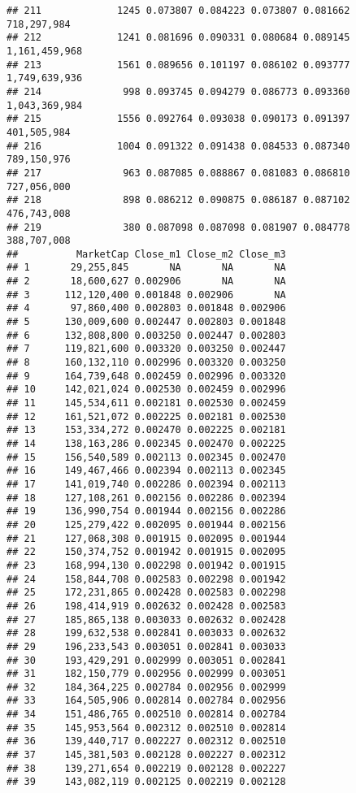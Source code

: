 \documentclass[]{article}
\begin{document}
\begin{verbatim}
## 211             1245 0.073807 0.084223 0.073807 0.081662   718,297,984
## 212             1241 0.081696 0.090331 0.080684 0.089145 1,161,459,968
## 213             1561 0.089656 0.101197 0.086102 0.093777 1,749,639,936
## 214              998 0.093745 0.094279 0.086773 0.093360 1,043,369,984
## 215             1556 0.092764 0.093038 0.090173 0.091397   401,505,984
## 216             1004 0.091322 0.091438 0.084533 0.087340   789,150,976
## 217              963 0.087085 0.088867 0.081083 0.086810   727,056,000
## 218              898 0.086212 0.090875 0.086187 0.087102   476,743,008
## 219              380 0.087098 0.087098 0.081907 0.084778   388,707,008
##          MarketCap Close_m1 Close_m2 Close_m3
## 1       29,255,845       NA       NA       NA
## 2       18,600,627 0.002906       NA       NA
## 3      112,120,400 0.001848 0.002906       NA
## 4       97,860,400 0.002803 0.001848 0.002906
## 5      130,009,600 0.002447 0.002803 0.001848
## 6      132,808,800 0.003250 0.002447 0.002803
## 7      119,821,600 0.003320 0.003250 0.002447
## 8      160,132,110 0.002996 0.003320 0.003250
## 9      164,739,648 0.002459 0.002996 0.003320
## 10     142,021,024 0.002530 0.002459 0.002996
## 11     145,534,611 0.002181 0.002530 0.002459
## 12     161,521,072 0.002225 0.002181 0.002530
## 13     153,334,272 0.002470 0.002225 0.002181
## 14     138,163,286 0.002345 0.002470 0.002225
## 15     156,540,589 0.002113 0.002345 0.002470
## 16     149,467,466 0.002394 0.002113 0.002345
## 17     141,019,740 0.002286 0.002394 0.002113
## 18     127,108,261 0.002156 0.002286 0.002394
## 19     136,990,754 0.001944 0.002156 0.002286
## 20     125,279,422 0.002095 0.001944 0.002156
## 21     127,068,308 0.001915 0.002095 0.001944
## 22     150,374,752 0.001942 0.001915 0.002095
## 23     168,994,130 0.002298 0.001942 0.001915
## 24     158,844,708 0.002583 0.002298 0.001942
## 25     172,231,865 0.002428 0.002583 0.002298
## 26     198,414,919 0.002632 0.002428 0.002583
## 27     185,865,138 0.003033 0.002632 0.002428
## 28     199,632,538 0.002841 0.003033 0.002632
## 29     196,233,543 0.003051 0.002841 0.003033
## 30     193,429,291 0.002999 0.003051 0.002841
## 31     182,150,779 0.002956 0.002999 0.003051
## 32     184,364,225 0.002784 0.002956 0.002999
## 33     164,505,906 0.002814 0.002784 0.002956
## 34     151,486,765 0.002510 0.002814 0.002784
## 35     145,953,564 0.002312 0.002510 0.002814
## 36     139,440,717 0.002227 0.002312 0.002510
## 37     145,381,503 0.002128 0.002227 0.002312
## 38     139,271,654 0.002219 0.002128 0.002227
## 39     143,082,119 0.002125 0.002219 0.002128

\end{verbatim}
\end{document}
